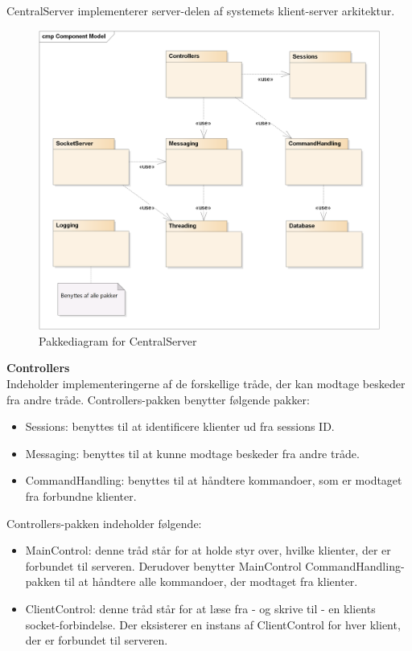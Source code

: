 CentralServer implementerer server-delen af systemets klient-server arkitektur. 

\begin{figure}[H]
    \centering
    \includegraphics[width=1\textwidth]{Systemdesign/CentralServer/Images/Packages.png}
    \caption{Pakkediagram for CentralServer}
    \label{fig:CSPackages}
\end{figure}


\textbf{Controllers}\\
Indeholder implementeringerne af de forskellige tråde, der kan modtage beskeder fra andre tråde. Controllers-pakken benytter følgende pakker:

\begin{itemize}
	\item Sessions: benyttes til at identificere klienter ud fra sessions ID.
	\item Messaging: benyttes til at kunne modtage beskeder fra andre tråde.
	\item CommandHandling: benyttes til at håndtere kommandoer, som er modtaget fra forbundne klienter.
\end{itemize}

Controllers-pakken indeholder følgende:

\begin{itemize}
	\item MainControl: denne tråd står for at holde styr over, hvilke klienter, der er forbundet til serveren. Derudover benytter MainControl CommandHandling-pakken til at håndtere alle kommandoer, der modtaget fra klienter.
	\item ClientControl: denne tråd står for at læse fra - og skrive til - en klients socket-forbindelse. Der eksisterer en instans af ClientControl for hver klient, der er forbundet til serveren.
\end{itemize}


